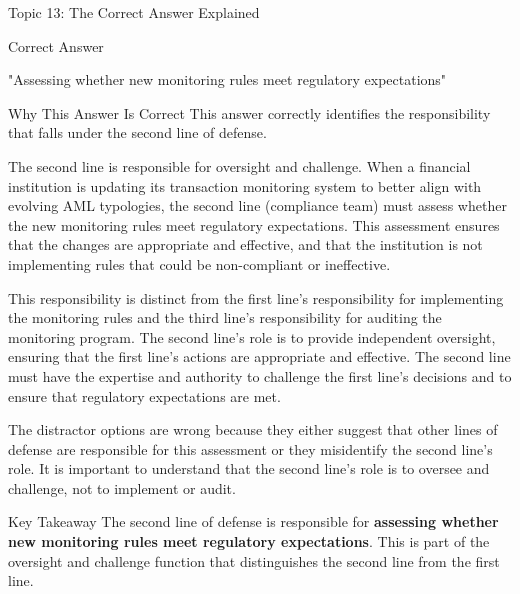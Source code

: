 \documentclass[8pt]{beamer}  %
\newcommand{\correct}{\textcolor{correctgreen}{\ding{51}}}
\begin{document}
	\begin{frame}{Topic 13: The Correct Answer Explained}
		\begin{block}{\large \correct \textcolor{correctgreen}{Correct Answer}}
			\begin{center}
				\Large "Assessing whether new monitoring rules meet regulatory expectations"
			\end{center}
		\end{block}
		
		\vspace{0.2cm}
		\begin{block}{\large Why This Answer Is Correct}
			This answer correctly identifies the responsibility that falls under the second line of defense.
			
			The second line is responsible for oversight and challenge. When a financial institution is updating its transaction monitoring system to better align with evolving AML typologies, the second line (compliance team) must assess whether the new monitoring rules meet regulatory expectations. This assessment ensures that the changes are appropriate and effective, and that the institution is not implementing rules that could be non-compliant or ineffective.
			
			This responsibility is distinct from the first line's responsibility for implementing the monitoring rules and the third line's responsibility for auditing the monitoring program. The second line's role is to provide independent oversight, ensuring that the first line's actions are appropriate and effective. The second line must have the expertise and authority to challenge the first line's decisions and to ensure that regulatory expectations are met.
			
			The distractor options are wrong because they either suggest that other lines of defense are responsible for this assessment or they misidentify the second line's role. It is important to understand that the second line's role is to oversee and challenge, not to implement or audit.
		\end{block}
		
		\begin{alertblock}{Key Takeaway}
			The second line of defense is responsible for \textbf{assessing whether new monitoring rules meet regulatory expectations}. This is part of the oversight and challenge function that distinguishes the second line from the first line.
		\end{alertblock}
	\end{frame}
	
\end{document}
